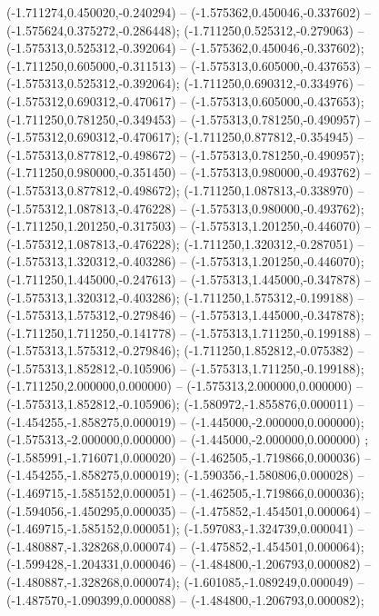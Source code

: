  (-1.711274,0.450020,-0.240294) -- (-1.575362,0.450046,-0.337602) -- (-1.575624,0.375272,-0.286448);
 (-1.711250,0.525312,-0.279063) -- (-1.575313,0.525312,-0.392064) -- (-1.575362,0.450046,-0.337602);
 (-1.711250,0.605000,-0.311513) -- (-1.575313,0.605000,-0.437653) -- (-1.575313,0.525312,-0.392064);
 (-1.711250,0.690312,-0.334976) -- (-1.575312,0.690312,-0.470617) -- (-1.575313,0.605000,-0.437653);
 (-1.711250,0.781250,-0.349453) -- (-1.575313,0.781250,-0.490957) -- (-1.575312,0.690312,-0.470617);
 (-1.711250,0.877812,-0.354945) -- (-1.575313,0.877812,-0.498672) -- (-1.575313,0.781250,-0.490957);
 (-1.711250,0.980000,-0.351450) -- (-1.575313,0.980000,-0.493762) -- (-1.575313,0.877812,-0.498672);
 (-1.711250,1.087813,-0.338970) -- (-1.575312,1.087813,-0.476228) -- (-1.575313,0.980000,-0.493762);
 (-1.711250,1.201250,-0.317503) -- (-1.575313,1.201250,-0.446070) -- (-1.575312,1.087813,-0.476228);
 (-1.711250,1.320312,-0.287051) -- (-1.575313,1.320312,-0.403286) -- (-1.575313,1.201250,-0.446070);
 (-1.711250,1.445000,-0.247613) -- (-1.575313,1.445000,-0.347878) -- (-1.575313,1.320312,-0.403286);
 (-1.711250,1.575312,-0.199188) -- (-1.575313,1.575312,-0.279846) -- (-1.575313,1.445000,-0.347878);
 (-1.711250,1.711250,-0.141778) -- (-1.575313,1.711250,-0.199188) -- (-1.575313,1.575312,-0.279846);
 (-1.711250,1.852812,-0.075382) -- (-1.575313,1.852812,-0.105906) -- (-1.575313,1.711250,-0.199188);
 (-1.711250,2.000000,0.000000) -- (-1.575313,2.000000,0.000000) -- (-1.575313,1.852812,-0.105906);
 (-1.580972,-1.855876,0.000011) -- (-1.454255,-1.858275,0.000019) -- (-1.445000,-2.000000,0.000000);
 (-1.575313,-2.000000,0.000000) -- (-1.445000,-2.000000,0.000000) ;
 (-1.585991,-1.716071,0.000020) -- (-1.462505,-1.719866,0.000036) -- (-1.454255,-1.858275,0.000019);
 (-1.590356,-1.580806,0.000028) -- (-1.469715,-1.585152,0.000051) -- (-1.462505,-1.719866,0.000036);
 (-1.594056,-1.450295,0.000035) -- (-1.475852,-1.454501,0.000064) -- (-1.469715,-1.585152,0.000051);
 (-1.597083,-1.324739,0.000041) -- (-1.480887,-1.328268,0.000074) -- (-1.475852,-1.454501,0.000064);
 (-1.599428,-1.204331,0.000046) -- (-1.484800,-1.206793,0.000082) -- (-1.480887,-1.328268,0.000074);
 (-1.601085,-1.089249,0.000049) -- (-1.487570,-1.090399,0.000088) -- (-1.484800,-1.206793,0.000082);

